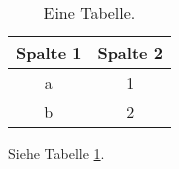 \begin{table}[htb]
\centering
\begin{tabular}{|c|c|}
	\hline
	Spalte 1 & Spalte 2 \\
	\hline
	a & 1 \\
	\hline
	b & 2 \\
	\hline
\end{tabular}
\caption{Eine Tabelle.}
\label{tab_a}
\end{table}

Siehe Tabelle \ref{tab_a}.